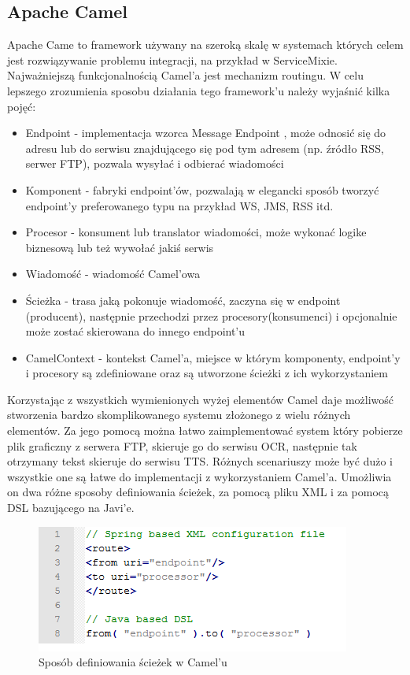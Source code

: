 \subsection{Apache Camel}
Apache Came \cite{camel2012} \cite{ibsen2010} to framework używany na szeroką skalę w systemach których celem jest rozwiązywanie problemu integracji, na przykład w ServiceMixie. Najważniejszą funkcjonalnością Camel'a jest mechanizm routingu. W celu lepszego zrozumienia sposobu działania tego framework'u należy wyjaśnić kilka pojęć:
\begin{itemize}
	\item Endpoint - implementacja wzorca Message Endpoint \cite{hohpe2003}, może odnosić się do adresu lub do serwisu znajdującego się pod tym adresem (np. źródło RSS, serwer FTP), pozwala wysyłać i odbierać wiadomości  
	\item Komponent - fabryki endpoint'ów, pozwalają w elegancki sposób tworzyć endpoint'y preferowanego typu na przykład WS, JMS, RSS itd.
	\item Procesor - konsument lub translator wiadomości, może wykonać logike biznesową lub też wywołać jakiś serwis
	\item Wiadomość - wiadomość Camel'owa
	\item Ścieżka - trasa jaką pokonuje wiadomość, zaczyna się w endpoint (producent), następnie przechodzi przez procesory(konsumenci) i opcjonalnie może zostać skierowana do innego endpoint'u 
	\item CamelContext - kontekst Camel'a, miejsce w którym komponenty, endpoint'y i procesory są zdefiniowane oraz są utworzone ścieżki z ich wykorzystaniem
\end{itemize}  
Korzystając z wszystkich wymienionych wyżej elementów Camel daje możliwość stworzenia bardzo skomplikowanego systemu złożonego z wielu różnych elementów. Za jego pomocą można łatwo zaimplementować system który pobierze plik graficzny z serwera FTP, skieruje go do serwisu OCR, następnie tak otrzymany tekst skieruje do serwisu TTS. Różnych scenariuszy może być dużo i wszystkie one są łatwe do implementacji z wykorzystaniem Camel'a. Umożliwia on dwa różne sposoby definiowania ścieżek, za pomocą pliku XML i za pomocą DSL bazującego na Javi'e.
\begin{figure}[!h]
	\centering
	\includegraphics[scale=0.95]{camel.png} 
	\caption{Sposób definiowania ścieżek w Camel'u}
\end{figure}
	
